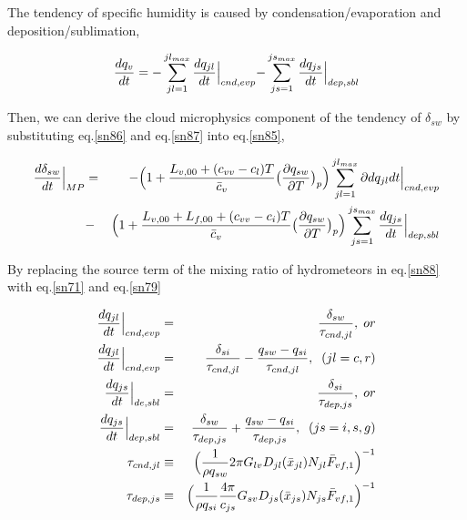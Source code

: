 The tendency of specific humidity is caused by condensation/evaporation and deposition/sublimation,

\begin{eqnarray}
\frac{dq_{v}}{dt}=-\sum_{jl=1}^{jl_{max}}\frac{dq_{jl}}{dt}\Bigl|_{cnd,evp}-\sum_{js=1}^{js_{max}}\frac{dq_{js}}{dt}\Bigr|_{dep,sbl}\label{sn87}
\end{eqnarray}

Then, we can derive the cloud microphysics component of the tendency of $\delta_{sw}$ by substituting eq.\ref{sn86} and eq.\ref{sn87} into eq.\ref{sn85},

\begin{eqnarray}
\frac{d\delta_{sw}}{dt}\Bigr|_{MP}&=&-\Bigl(1+\frac{L_{v,00}+(c_{vv}-c_{l})T}{\bar{c}_{v}}\bigl(\frac{\partial q_{sw}}{\partial T}\bigr)_{p}\Bigr)\sum_{jl=1}^{jl_{max}}\partial{dq_{jl}}{dt}\Bigr|_{cnd,evp}\nonumber\\
&-&\Bigl(1+\frac{L_{v,00}+L_{f,00}+(c_{vv}-c_{i})T}{\bar{c}_{v}}\bigl(\frac{\partial q_{sw}}{\partial T}\bigr)_{p}\Bigr)\sum^{js_{max}}_{js=1}\frac{dq_{js}}{dt}\Bigr|_{dep,sbl}\label{sn88}
\end{eqnarray}

By replacing the source term of the mixing ratio of hydrometeors in eq.\ref{sn88} with eq.\ref{sn71} and eq.\ref{sn79}

\begin{eqnarray}
\frac{dq_{jl}}{dt}\Bigr|_{cnd,evp}&=&\frac{\delta_{sw}}{\tau_{cnd,jl}},\;or\nonumber\\
\frac{dq_{jl}}{dt}\Bigr|_{cnd,evp}&=&\frac{\delta_{si}}{\tau_{cnd,jl}}-\frac{q_{sw}-q_{si}}{\tau_{cnd,jl}},\;\;(jl=c,r)\label{89}\\
\frac{dq_{js}}{dt}\Bigr|_{de,sbl}&=&\frac{\delta_{si}}{\tau_{dep,js}},\;or\nonumber\\
\frac{dq_{js}}{dt}\Bigr|_{dep,sbl}&=&\frac{\delta_{sw}}{\tau_{dep,js}}+\frac{q_{sw}-q_{si}}{\tau_{dep,js}},\;\;(js=i,s,g)\label{90}\\
\tau_{cnd,jl} &\equiv& \Bigl(\frac{1}{\rho q_{sw}} 2\pi G_{lv}D_{jl}(\bar{x}_{jl})N_{jl}\bar{F}_{vf,1}\Bigr)^{-1}\label{sn91}\\
\tau_{dep,js} &\equiv& \Bigl(\frac{1}{\rho q_{si}}\frac{4\pi}{c_{js}}G_{sv}D_{js}(\bar{x}_{js})N_{js}\bar{F}_{vf,1}\Bigr)^{-1}\label{sn92}
\end{eqnarray}


